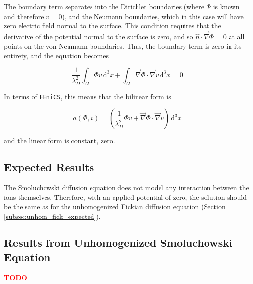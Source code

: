 The boundary term separates into the Dirichlet boundaries (where $\Phi$ is known and therefore $v=0$),
and the Neumann boundaries, which in this case will have zero electric field normal to the surface.
This condition requires that the derivative of the potential normal to the surface is zero,
and so $\hat{n} \cdot \vec{\nabla} \Phi = 0$ at all points on the von Neumann boundaries.
Thus, the boundary term is zero in its entirety, and the equation becomes

\begin{equation}
\frac{1}{\lambda_D^2} \int_{\Omega} \Phi v \,\mathrm{d}^3x
+ \int_{\Omega} \vec{\nabla}\Phi \cdot \vec{\nabla}v \,\mathrm{d}^3x
= 0
\end{equation}

In terms of \texttt{FEniCS}, this means that the bilinear form is

\begin{equation}
a(\Phi,v)=\left(\frac{1}{\lambda_D^2} \Phi v  + \vec{\nabla}\Phi \cdot \vec{\nabla}v \right) \,\mathrm{d}^3x
\end{equation}

and the linear form is constant, zero.

\subsection{Expected Results}\label{subsec:unhom_smol_expected}

The Smoluchowski diffusion equation does not model any interaction between the ions themselves.
Therefore, with an applied potential of zero,
the solution should be the same as for the
unhomogenized Fickian diffusion equation (Section \ref{subsec:unhom_fick_expected}).

\subsection{Results from Unhomogenized Smoluchowski Equation}\label{subsec:res_unhom_smol}

\textcolor{red}{\textbf{TODO}}

